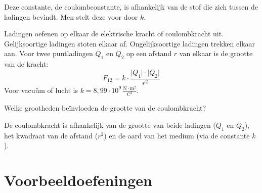 \documentclass{ximera}
\begin{document}
Deze constante, de coulombconstante, is afhankelijk van de stof die zich tussen de ladingen bevindt. Men stelt deze voor door $k$.

\begin{proposition}[title={Wet van Coulomb}]\nl
    Ladingen oefenen op elkaar de elektrische kracht of coulombkracht uit. Gelijksoortige ladingen stoten elkaar af. Ongelijksoortige ladingen trekken elkaar aan. Voor twee puntladingen $Q_{1}$ en $Q_{2}$ op een afstand $r$ van elkaar is de grootte van de kracht:
    \begin{equation}\label{eq:coulombkracht}
    F_{12} = k \cdot \frac{\lvert Q_{1}\rvert\cdot \lvert Q_{2}\rvert}{r^{2}}
    \end{equation}
    Voor vacuüm of lucht is $k = 8{,}99 \cdot 10^9 \, \mathrm{\frac{N\cdot m^2}{C^2}}$.
\end{proposition}

\begin{question}\label{q:formule coulomb}
    Welke grootheden beïnvloeden de grootte van de coulombkracht?
        \begin{multipleChoice}
        \end{multipleChoice}
        \begin{solution}
            De coulombkracht is afhankelijk van de grootte van beide ladingen ($Q_1$ en $Q_2$), het kwadraat van de afstand ($r^2$) en de aard van het medium (via de constante $k$).
        \end{solution}
\end{question}


\section{Voorbeeldoefeningen}
\end{document}

